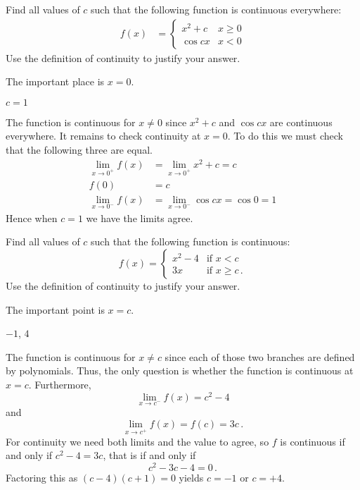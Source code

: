 \begin{question}[2015Q]
Find all values of $c$ such that the following function is continuous everywhere:
\begin{align*}
  f(x) &= \begin{cases}
           x^2+c & x\geq 0\\
	  \cos cx & x< 0
          \end{cases}
\end{align*}
Use the definition of continuity to justify your answer.
\end{question}
\begin{hint} The important place is $x=0$.
\end{hint}
\begin{answer} $c=1$
\end{answer}
\begin{solution}
The function is continuous for $x \ne 0$ since $x^2+c$ and
          $\cos cx$ are continuous everywhere. It remains to check continuity at
$x=0$. To do this we must check that the following three are equal.
\begin{align*}
  \lim_{x \to 0^+} f(x) &= \lim_{x\to 0^+} x^2+c = c\\
  f(0) &= c \\
  \lim_{x \to 0^-} f(x) &= \lim_{x\to 0^-} \cos cx = \cos 0 = 1
\end{align*}
Hence when $c=1$ we have the limits agree.
\end{solution}



\begin{Mquestion}[2015Q]
Find all values of $c$ such that the following function is continuous:
\[f(x) = \begin{cases}
      x^2-4 & \text{if } x< c\\
      3x &  \text{if } x \ge c\,.
\end{cases} \]
Use the definition of continuity to justify your answer.
\end{Mquestion}
\begin{hint} The important point is $x=c$.
\end{hint}
\begin{answer}$-1$, $4$
\end{answer}
\begin{solution}
The function is continuous for $x\ne c$ since each of those two branches are
defined by polynomials.  Thus, the only question is
whether the function is continuous at $x=c$. Furthermore,
$$\lim_{x\to c^-}f(x) = c^2-4 $$
and
$$\lim_{x\to c^+}f(x) = f(c) = 3c\,.$$
For continuity we need both limits and the value to agree, so $f$ is
continuous if and only if $c^2-4 = 3c$, that is if and only if
$$ c^2-3c-4 = 0\,.$$
Factoring this as $(c-4)(c+1) = 0$ yields $c=-1$ or $c=+4$.
\end{solution}

